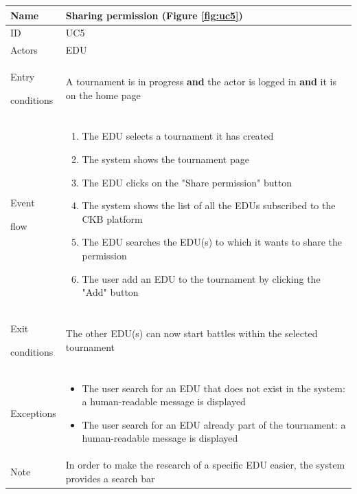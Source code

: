 \begin{center}
    \def\arraystretch{1.5}
    \begin{tabular}{| m{2cm} | m{10cm}|}
        \hline
        Name                  & Sharing permission (Figure \ref{fig:uc5})                                                                                   \\ \hline
        ID                    & UC5                                                                                                  \\ \hline
        Actors                & EDU                                                                                                  \\ \hline
        Entry \par conditions & A tournament is in progress \textbf{and} the actor is logged in \textbf{and} it is on the home page \\ \hline
        Event \par flow       & \begin{enumerate}
                                    \item The EDU selects a tournament it has created
                                    \item The system shows the tournament page
                                    \item The EDU clicks on the "Share permission" button
                                    \item The system shows the list of all the EDUs subscribed to the CKB platform
                                    \item The EDU searches the EDU(s) to which it wants to share the permission
                                    \item The user add an EDU to the tournament by clicking the "Add" button
                                \end{enumerate}                        \\ \hline
        Exit \par conditions  & The other EDU(s) can now start battles within the selected tournament                                \\ \hline
        Exceptions            & \begin{itemize}
                                    \item The user search for an EDU that does not exist in the system: a human-readable message is displayed 
                                    \item The user search for an EDU already part of the tournament: a human-readable message is displayed 
                                \end{itemize}                                                                                         \\ \hline
        Note                  & In order to make the research of a specific EDU easier, the system provides a search bar             \\ \hline
    \end{tabular}
\end{center}

